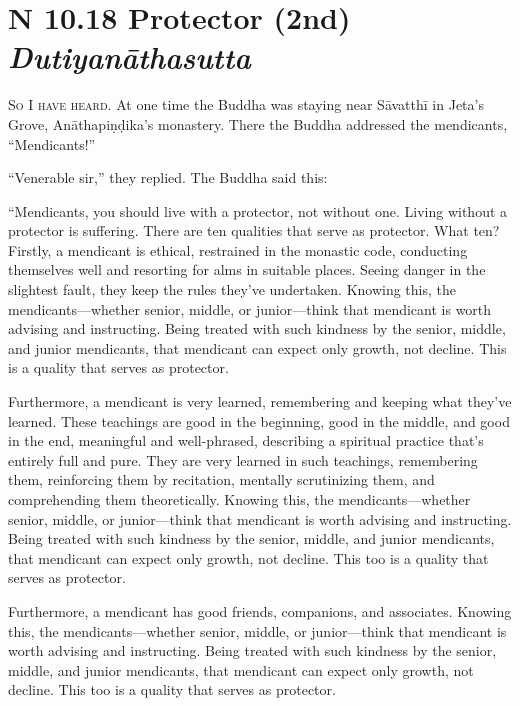 \documentclass[12pt,openany]{book}%
\newcommand*{\suttatitleacronym}[1]{\smaller[2]{#1}\vspace*{.3em}}
\newcommand*{\suttatitletranslation}[1]{\linebreak{#1}}
\newcommand*{\suttatitleroot}[1]{\linebreak\smaller[2]\itshape{#1}}
\newcommand*{\tocacronym}[1]{\hspace*{-3.3em}{#1}\quad}
\newcommand*{\toctranslation}[1]{#1}
\newcommand*{\tocroot}[1]{(\textit{#1})}
\newcommand*{\scevam}[1]{\textsc{#1}}
\begin{document}
%
\section*{{\suttatitleacronym AN 10.18}{\suttatitletranslation A Protector (2nd) }{\suttatitleroot Dutiyanāthasutta}}
\addcontentsline{toc}{section}{\tocacronym{AN 10.18} \toctranslation{A Protector (2nd) } \tocroot{Dutiyanāthasutta}}

\scevam{So I have heard. }At one time the Buddha was staying near \textsanskrit{Sāvatthī} in Jeta’s Grove, \textsanskrit{Anāthapiṇḍika}’s monastery. There the Buddha addressed the mendicants, “Mendicants!” 

“Venerable sir,” they replied. The Buddha said this: 

“Mendicants, you should live with a protector, not without one. Living without a protector is suffering. There are ten qualities that serve as protector. What ten? Firstly, a mendicant is ethical, restrained in the monastic code, conducting themselves well and resorting for alms in suitable places. Seeing danger in the slightest fault, they keep the rules they’ve undertaken. Knowing this, the mendicants—whether senior, middle, or junior—think that mendicant is worth advising and instructing. Being treated with such kindness by the senior, middle, and junior mendicants, that mendicant can expect only growth, not decline. This is a quality that serves as protector. 

Furthermore, a mendicant is very learned, remembering and keeping what they’ve learned. These teachings are good in the beginning, good in the middle, and good in the end, meaningful and well-phrased, describing a spiritual practice that’s entirely full and pure. They are very learned in such teachings, remembering them, reinforcing them by recitation, mentally scrutinizing them, and comprehending them theoretically. Knowing this, the mendicants—whether senior, middle, or junior—think that mendicant is worth advising and instructing. Being treated with such kindness by the senior, middle, and junior mendicants, that mendicant can expect only growth, not decline. This too is a quality that serves as protector. 

Furthermore, a mendicant has good friends, companions, and associates. Knowing this, the mendicants—whether senior, middle, or junior—think that mendicant is worth advising and instructing. Being treated with such kindness by the senior, middle, and junior mendicants, that mendicant can expect only growth, not decline. This too is a quality that serves as protector. 
\end{document}
